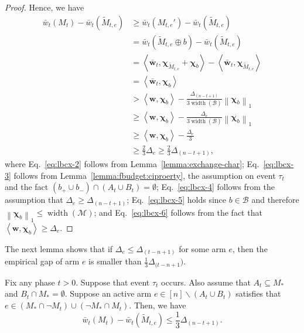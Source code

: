 \documentclass{article}
\newcommand{\M}{\mathcal M}
\newcommand{\B}{\mathcal B}
\newcommand{\del}{\backslash}
\DeclareMathOperator{\rank}{width}
\newcommand{\inn}[1]{\left\langle #1 \right\rangle}
\newcommand{\nor}[1]{\left\|#1\right\|}
\renewcommand{\vec}[1]{\boldsymbol{#1}}
\begin{document}
\begin{proof}
Hence, we have
\begin{align}
\bar w_t(M_t) - \bar w_t(\tilde M_{t,e}) &\ge 
\bar w_t(M_{t,e}') - \bar w_t(\tilde M_{t,e}) \nonumber \\
&= \bar w_t(\tilde M_{t,e} \oplus b ) - \bar w_t(\tilde M_{t,e}) \nonumber \\
&= \inn{\vec {\bar w}_t, \vec\chi_{\tilde M_{t,e}}+\vec\chi_b}-\inn{\vec {\bar w}_t, \vec\chi_{\tilde M_{t,e}}} \label{eq:lbcx-2}\\
&= \inn{\vec {\bar w}_t, \vec\chi_b} \nonumber\\
&> \inn{\vec w, \vec\chi_b}-\frac{\Delta_{(n-t+1)}}{3\rank(\B)}\nor{\vec\chi_b}_1 \label{eq:lbcx-3}\\
&\ge \inn{\vec w, \vec\chi_b}-\frac{\Delta_e}{3\rank(\B)}\nor{\vec\chi_b}_1 \label{eq:lbcx-4}\\
&\ge \inn{\vec w, \vec\chi_b}-\frac{\Delta_e}{3}\label{eq:lbcx-5}\\
&\ge \frac{2}{3}\Delta_e \ge \frac{2}{3}\Delta_{(n-t+1)},\label{eq:lbcx-6}
\end{align}
where Eq.~\eqref{eq:lbcx-2} follows from Lemma~\ref{lemma:exchange-char};
Eq.~\eqref{eq:lbcx-3} follows from Lemma~\ref{lemma:fbudget:ciproerty}, the assumption on event $\tau_t$ and the fact $(b_+\cup b_-) \cap (A_t \cup B_t) = \emptyset$;
Eq.~\eqref{eq:lbcx-4} follows from the assumption that $\Delta_e \ge \Delta_{(n-t+1)}$;
Eq.~\eqref{eq:lbcx-5} holds since $b\in \B$ and therefore $\nor{\vec\chi_b}_1  \le \rank(\M)$;
and Eq.~\eqref{eq:lbcx-6} follows from the fact that $\inn{\vec w, \vec\chi_b} \ge \Delta_e$.

\end{proof}

The next lemma shows that if $\Delta_e \le \Delta_{(t-n+1)}$ for some arm $e$, then the empirical gap of arm $e$ is smaller than $\frac13 \Delta_{(t-n+1})$.
\begin{lemma}
\label{lemma-budget-e}
Fix any phase $t>0$. 
Suppose that event $\tau_t$ occurs.
Also assume that $A_t \subseteq M_*$ and $B_t \cap M_* = \emptyset$.
Suppose an active arm $e\in [n] \del (A_t\cup B_t)$  satisfies that $e\in (M_*\cap \neg M_t) \cup (\neg M_* \cap M_t)$. 
Then, we have
$$
\bar w_t(M_t) - \bar w_t(\tilde M_{t,e}) \le \frac{1}{3} \Delta_{(n-t+1)}.
$$
\end{lemma}
\end{document}
